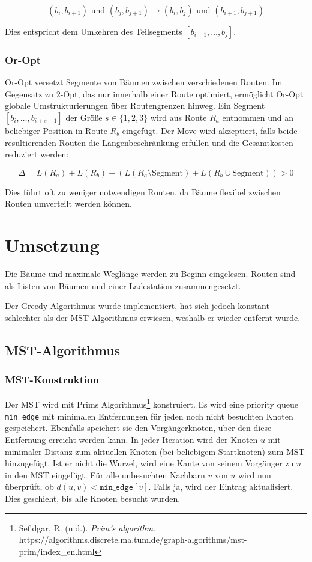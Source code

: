 \documentclass[a4paper,10pt,ngerman]{scrartcl}
\begin{document}
    \[
        (b_i, b_{i+1}) \text{ und } (b_j, b_{j+1}) \to
        (b_i, b_j) \text{ und } (b_{i+1}, b_{j+1})
    \]

    Dies entspricht dem Umkehren des Teilsegments $[b_{i+1}, \ldots, b_j]$.

    \subsubsection{Or-Opt}
    Or-Opt versetzt Segmente von Bäumen zwischen verschiedenen Routen. Im Gegensatz zu 2-Opt, das nur innerhalb einer
    Route optimiert, ermöglicht Or-Opt globale Umstrukturierungen über Routengrenzen hinweg.
    Ein Segment $[b_i, \ldots, b_{i+s-1}]$ der Größe $s \in \{1, 2, 3\}$ wird aus Route $R_a$ entnommen und an
    beliebiger Position in Route $R_b$ eingefügt. Der Move wird akzeptiert, falls beide resultierenden Routen die
    Längenbeschränkung erfüllen und die Gesamtkosten reduziert werden:

    \[
        \Delta = L(R_a) + L(R_b) - (L(R_a \setminus \text{Segment}) + L(R_b \cup \text{Segment})) > 0
    \]

    Dies führt oft zu weniger notwendigen Routen, da Bäume flexibel zwischen Routen umverteilt werden können.

    \section{Umsetzung}
    Die Bäume und maximale Weglänge werden zu Beginn eingelesen. Routen sind als Listen von Bäumen und einer
    Ladestation zusammengesetzt.

    Der Greedy-Algorithmus wurde implementiert, hat sich jedoch konstant schlechter als der MST-Algorithmus erwiesen,
    weshalb er wieder entfernt wurde.

    \subsection{MST-Algorithmus}
    \subsubsection{MST-Konstruktion}
    Der MST wird mit Prims Algorithmus\footnote{
        Sefidgar, R. (n.d.). \textit{Prim’s algorithm}.
        https://algorithms.discrete.ma.tum.de/graph-algorithms/mst-prim/index\_en.html
    } konstruiert. Es wird eine priority queue \texttt{min\_edge} mit minimalen Entfernungen für jeden noch nicht
    besuchten Knoten gespeichert. Ebenfalls speichert sie den Vorgängerknoten, über den diese Entfernung erreicht werden
    kann. In jeder Iteration wird der Knoten $u$ mit minimaler Distanz zum aktuellen Knoten (bei beliebigem Startknoten)
    zum MST hinzugefügt. Ist er nicht die Wurzel, wird eine Kante von seinem Vorgänger zu $u$ in den MST eingefügt.
    Für alle unbesuchten Nachbarn $v$ von $u$ wird nun überprüft, ob $d(u, v) < \texttt{min\_edge}[v]$. Falls ja,
    wird der Eintrag aktualisiert. Dies geschieht, bis alle Knoten besucht wurden.
\end{document}
